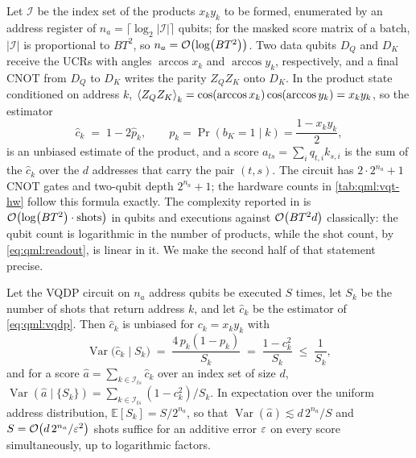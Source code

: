 Let $\mathcal{I}$ be the index set of the products $x_k y_k$ to be formed, enumerated by an address register of $n_a = \lceil \log_2 |\mathcal{I}| \rceil$ qubits; for the masked score matrix of a batch, $|\mathcal{I}|$ is proportional to $BT^2$, so $n_a = \mathcal{O}\!\left(\log(BT^2)\right)$. Two data qubits $D_Q$ and $D_K$ receive the UCRs with angles $\arccos x_k$ and $\arccos y_k$, respectively, and a final CNOT from $D_Q$ to $D_K$ writes the parity $Z_Q Z_K$ onto $D_K$. In the product state conditioned on address $k$, $\expval{Z_Q Z_K}_k = \cos(\arccos x_k)\cos(\arccos y_k) = x_k y_k$, so the estimator
\begin{equation}\label{eq:qml:vqdp}
\hat{c}_k \;=\; 1 - 2\hat{p}_k, \qquad p_k = \Pr(b_K = 1 \mid k) = \frac{1 - x_k y_k}{2},
\end{equation}
is an unbiased estimate of the product, and a score $a_{ts} = \sum_{i} q_{t,i} k_{s,i}$ is the sum of the $\hat{c}_k$ over the $d$ addresses that carry the pair $(t,s)$. The circuit has $2 \cdot 2^{n_a} + 1$ CNOT gates and two-qubit depth $2^{n_a} + 1$; the hardware counts in \cref{tab:qml:vqt-hw} follow this formula exactly. The complexity reported in \cite{guo2025vqt} is $\mathcal{O}\!\left(\log(BT^2)\cdot \text{shots}\right)$ in qubits and executions against $\mathcal{O}\!\left(BT^2 d\right)$ classically: the qubit count is logarithmic in the number of products, while the shot count, by \cref{eq:qml:readout}, is linear in it. We make the second half of that statement precise.

\begin{proposition}\label{thm:qml:vqdp-variance}
Let the VQDP circuit on $n_a$ address qubits be executed $S$ times, let $S_k$ be the number of shots that return address $k$, and let $\hat{c}_k$ be the estimator of \cref{eq:qml:vqdp}. Then $\hat{c}_k$ is unbiased for $c_k = x_k y_k$ with
\begin{equation}\label{eq:qml:vqdp-var}
\operatorname{Var}\big(\hat{c}_k \mid S_k\big) \;=\; \frac{4\,p_k(1-p_k)}{S_k} \;=\; \frac{1 - c_k^2}{S_k} \;\le\; \frac{1}{S_k},
\end{equation}
and for a score $\hat{a} = \sum_{k \in \mathcal{I}_{ts}} \hat{c}_k$ over an index set of size $d$,
$\operatorname{Var}(\hat{a} \mid \{S_k\}) = \sum_{k \in \mathcal{I}_{ts}} (1 - c_k^2)/S_k$. In expectation over the uniform address distribution, $\mathbb{E}[S_k] = S/2^{n_a}$, so that $\operatorname{Var}(\hat{a}) \lesssim d\,2^{n_a}/S$ and $S = \mathcal{O}\!\left(d\,2^{n_a}/\varepsilon^2\right)$ shots suffice for an additive error $\varepsilon$ on every score simultaneously, up to logarithmic factors.
\end{proposition}

